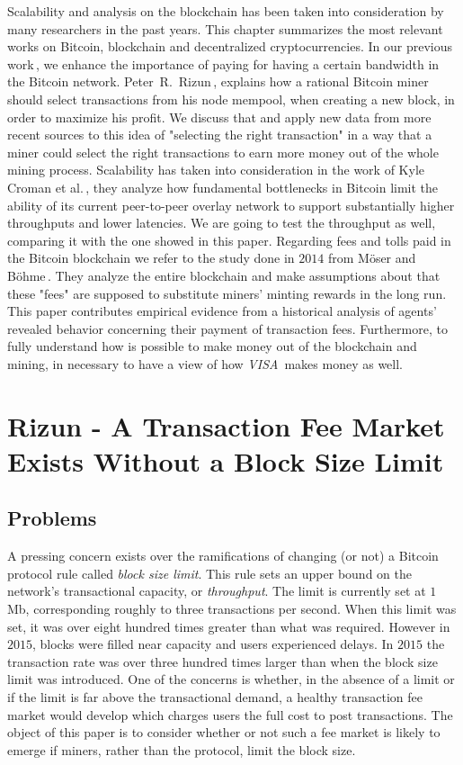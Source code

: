 \label{chap:prev_works}
Scalability and analysis on the blockchain
has been taken into consideration
by many researchers in the past years.
This chapter summarizes the most
relevant works on Bitcoin,
blockchain and decentralized cryptocurrencies.
In our previous work\,\cite{Tedeschi:2016:PBB}, we enhance
the importance of paying for having a certain
bandwidth in the Bitcoin network.
Peter~R.~Rizun\,\cite{Rizun:2015:blocksizelimit},
explains how a rational Bitcoin
miner should select transactions from his node mempool,
when creating a new block,
in order to maximize his profit. We discuss that and apply
new data from more recent sources to this idea of
"selecting the right transaction" in a way that a miner could
select the right transactions to earn more money out of the whole
mining process.
Scalability has taken into consideration
in the work of Kyle Croman et al.\,\cite{croman2016}, they
analyze how fundamental bottlenecks in Bitcoin limit the ability
of its current peer-to-peer
overlay network to support substantially higher
throughputs and lower latencies. We are
going to test the throughput as well, comparing it with the one
showed in this paper.
Regarding fees and tolls paid in the Bitcoin blockchain
we refer to the study done in $2014$ from Möser and
Böhme\,\cite{Moser2015}. They analyze the
entire blockchain and make assumptions about
that these "fees" are supposed to substitute miners'
minting rewards in the long run. This paper
contributes empirical evidence from a historical
analysis of agents' revealed behavior concerning
their payment of transaction fees.
Furthermore, to fully understand how is possible
to make money out of the blockchain and mining,
in necessary to have a view of
how \emph{VISA}\,\cite{visa} makes money as well.

\section{Rizun - A Transaction Fee Market Exists Without a Block Size Limit}
\label{sec:rizun}
\subsection{Problems}
A pressing concern exists over the ramifications of changing (or not)
a Bitcoin protocol rule called \emph{block size limit}. This rule sets an
upper bound on the network's transactional capacity, or \emph{throughput}.
The limit is currently set at $1$\,Mb, corresponding roughly to three transactions
per second. When this limit was set, it was over eight hundred times
greater than what was required. However in $2015$, blocks
were filled near capacity and users experienced delays. In $2015$
the transaction rate was over three hundred times larger
than when the block size limit was introduced. One of the
concerns is whether, in the absence of a limit or if the limit
is far above the transactional demand, a healthy transaction
fee market would develop which charges users the full
cost to post transactions. The object
of this paper is to consider whether or not such a fee
market is likely to emerge if miners, rather than the protocol,
limit the block size.
